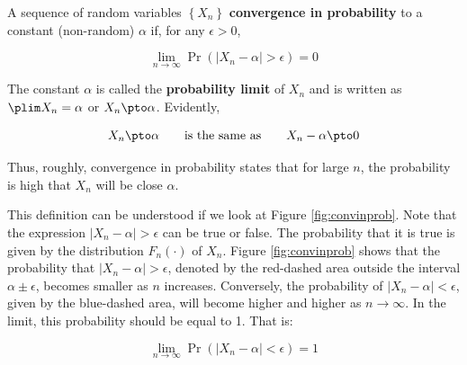 \documentclass[english,12pt]{book}\usepackage[]{graphicx}\usepackage[]{xcolor}
\begin{document}
\begin{definition}\label{definition:convergence_in_probability}
	A sequence of random variables $\left\{X_n\right\}$ \textbf{convergence in probability} to a constant (non-random) $\alpha$ if, for any $\epsilon>0$,
	
	\begin{equation*}
	\lim_{n\to \infty} \Pr(\left|X_n-\alpha\right|>\epsilon)=0
	\end{equation*}
	
	The constant $\alpha$ is called the \textbf{probability limit} of $X_n$ and is written as $\plim X_n=\alpha$ or $X_n\pto \alpha$. Evidently,
	
	\begin{equation*}
	X_n\pto \alpha\qquad\mbox{is the same as}\qquad X_n-\alpha\pto 0
	\end{equation*}	
\end{definition}

Thus, roughly, convergence in probability states that for large $n$, the probability is high that $X_n$ will be close $\alpha$.

This definition can be understood if we look at Figure \ref{fig:convinprob}. Note that the expression $\left|X_n-\alpha\right|>\epsilon$ can be true or false. The probability that it is true is given by the distribution $F_n(\cdot)$ of $X_n$. Figure \ref{fig:convinprob} shows that the probability that $\left|X_n-\alpha\right|>\epsilon$,  denoted by the red-dashed area outside the interval $\alpha \pm \epsilon$, becomes smaller as $n$ increases. Conversely, the probability of $\left|X_n-\alpha\right|<\epsilon$, given by the blue-dashed area, will become higher and higher as $n\to \infty$. In the limit, this probability should be equal to 1. That is:

\begin{equation*}
	\lim_{n\to \infty} \Pr(\left|X_n-\alpha\right|<\epsilon)=1
\end{equation*}
\end{document}
